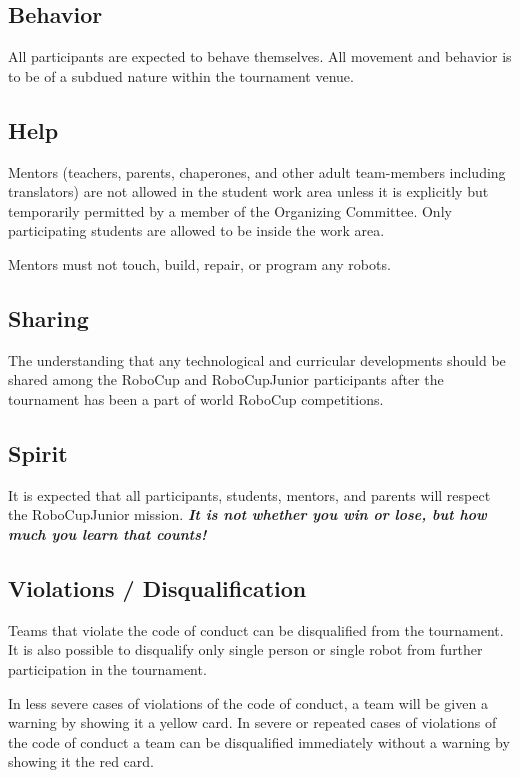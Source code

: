 \documentclass{article}
\begin{document}
\subsection{ Behavior \label{ref-042}}

All participants are expected to behave themselves. All movement and behavior
is to be of a subdued nature within the tournament venue.

\subsection{ Help \label{ref-043}}

Mentors (teachers, parents, chaperones, and other adult team-members including
translators) are not allowed in the student work area unless it is explicitly
but temporarily permitted by a member of the Organizing Committee. Only
participating students are allowed to be inside the work area.

Mentors must not touch, build, repair, or program any robots.

\subsection{ Sharing \label{ref-044}}

The understanding that any technological and curricular developments should be
shared among the RoboCup and RoboCupJunior participants after the tournament
has been a part of world RoboCup competitions.

\subsection{ Spirit \label{ref-045}}

It is expected that all participants, students, mentors, and parents will
respect the RoboCupJunior mission. \textbf{\textit{It is not whether you win or
lose, but how much you learn that counts!}}

\subsection{ Violations / Disqualification \label{ref-046}}

Teams that violate the code of conduct can be disqualified from the tournament.
It is also possible to disqualify only single person or single robot from
further participation in the tournament.

In less severe cases of violations of the code of conduct, a team will be given
a warning by showing it a yellow card. In severe or repeated cases of
violations of the code of conduct a team can be disqualified immediately
without a warning by showing it the red card.
\end{document}
